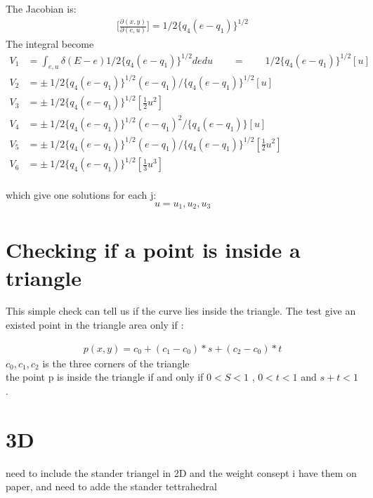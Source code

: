 \documentclass[11pt,a4paper]{article}
\begin{document}
The Jacobian is:
\begin{align}
\bigg[\frac {\partial (x,y)}{\partial (e,u)}\bigg] = 1/2\{ q_4(e-q_1)\}^{1/2}
\end{align}
The integral become
\begin{align}
V_1  &=  \int_{e,u} \delta (E-e)   1/2\{ q_4(e-q_1)\}^{1/2} de du \qquad = \qquad 1/2\{ q_4(e-q_1)\}^{1/2} [u] \\
V_2  &=  \pm \  1/2\{ q_4(e-q_1)\}^{1/2}  (e-q_1)/ \{q_4(e-q_1) \}^{1/2}   [u] \\
V_3  &=  \pm \  1/2\{ q_4(e-q_1)\}^{1/2} [\frac {1}{2}u^2] \\
V_4  &=  \pm \  1/2\{ q_4(e-q_1)\}^{1/2}(e-q_1)^2/ \{q_4(e-q_1) \} [u] \\
V_5  &=  \pm \  1/2\{ q_4(e-q_1)\}^{1/2} (e-q_1)/ \{q_4(e-q_1) \}^{1/2}  [\frac {1}{2}u^2] \\
V_6  &=  \pm \  1/2\{ q_4(e-q_1)\}^{1/2} [\frac{1}{3}u^3] \\
\end{align}

which give one solutions for each j:
\begin{equation}
u = u_1,u_2,u_3
\end{equation}

\section{Checking if a point is inside a triangle}
This simple check can tell us if the curve lies inside the triangle. The test give an existed point in the triangle area only if :

 \begin{align}
p(x,y) = c_0 + (c_1 - c_0) * s + (c_2 - c_0) * t
\end{align}
$c_0,c_1,c_2$ is the three corners of the triangle\\
the point p is inside the triangle if and only if $ 0 <  S  < 1$ ,  $0 < t < 1 $  and $s+t< 1$.

\section{3D}
need to include the stander triangel in 2D and the weight consept i have them on paper, and need to adde the stander tettrahedral
\end{document}
